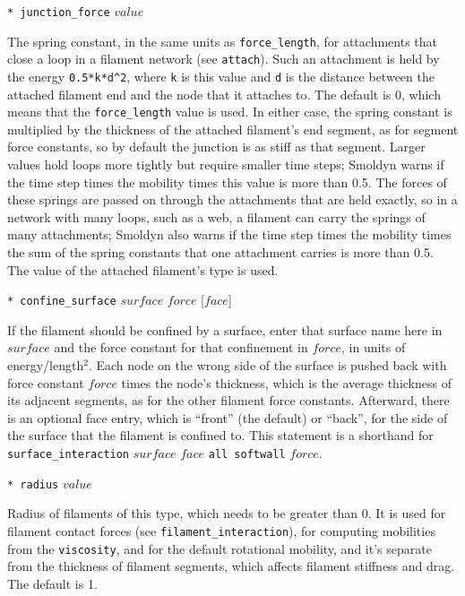 \documentclass {scrbook}
\newcommand {\ttt} {\texttt}
\begin{document}
\begin{description}
\item{\ttt{* junction\_force} $value$}

The spring constant, in the same units as \ttt{force\_length}, for attachments that close a loop in a filament network (see \ttt{attach}). Such an attachment is held by the energy \ttt{0.5*k*d\^{}2}, where \ttt{k} is this value and \ttt{d} is the distance between the attached filament end and the node that it attaches to. The default is 0, which means that the \ttt{force\_length} value is used. In either case, the spring constant is multiplied by the thickness of the attached filament's end segment, as for segment force constants, so by default the junction is as stiff as that segment. Larger values hold loops more tightly but require smaller time steps; Smoldyn warns if the time step times the mobility times this value is more than 0.5. The forces of these springs are passed on through the attachments that are held exactly, so in a network with many loops, such as a web, a filament can carry the springs of many attachments; Smoldyn also warns if the time step times the mobility times the sum of the spring constants that one attachment carries is more than 0.5. The value of the attached filament's type is used.

\item{\ttt{* confine\_surface} $surface$ $force$ [$face$]}%

If the filament should be confined by a surface, enter that surface name here in $surface$ and the force constant for that confinement in $force$, in units of energy/length$^2$. Each node on the wrong side of the surface is pushed back with force constant $force$ times the node's thickness, which is the average thickness of its adjacent segments, as for the other filament force constants. Afterward, there is an optional face entry, which is ``front'' (the default) or ``back'', for the side of the surface that the filament is confined to. This statement is a shorthand for \ttt{surface\_interaction} $surface$ $face$ \ttt{all softwall} $force$.

\item{\ttt{* radius} $value$}

Radius of filaments of this type, which needs to be greater than 0. It is used for filament contact forces (see \ttt{filament\_interaction}), for computing mobilities from the \ttt{viscosity}, and for the default rotational mobility, and it's separate from the thickness of filament segments, which affects filament stiffness and drag. The default is 1.


\end{description}
\end{document}
